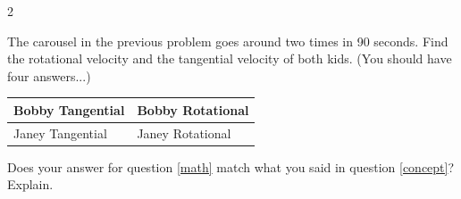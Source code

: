 \documentclass[10pt]{exam}
\begin{document}
\begin{questions}
\begin{multicols}{2}
\begin{flushright}
    \end{flushright}

  \end{multicols}


\question
  The carousel in the previous problem goes around two times in 90 seconds.  Find the rotational velocity and the tangential velocity of both kids.  (You should have four answers...) \label{math}

  \begin{tabular}{p{2.7in}|p{2.7in}}
    Bobby Tangential & Bobby Rotational \\[10em]\hline
    Janey Tangential & Janey Rotational \\[10em]
  \end{tabular}


\question
  Does your answer for question \ref{math} match what you said in question \ref{concept}?  Explain.
\vspace{0.6in}

\end{questions}
  
\end{document}
